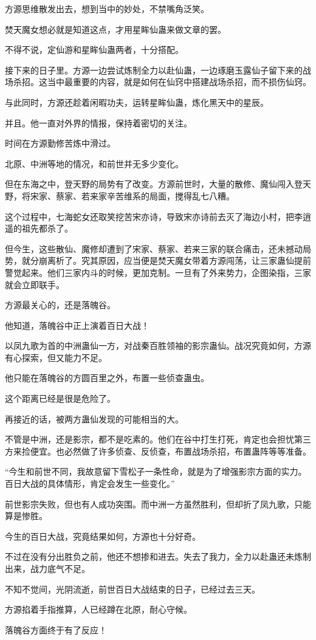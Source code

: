 \begin{this_body}
方源思维散发出去，想到当中的妙处，不禁嘴角泛笑。

焚天魔女想必就是知道这点，才用星眸仙蛊来做文章的罢。

不得不说，定仙游和星眸仙蛊两者，十分搭配。

接下来的日子里。方源一边尝试炼制全力以赴仙蛊，一边琢磨玉露仙子留下来的战场杀招。这当中最重要的内容，就是如何在仙窍中搭建战场杀招，而不损伤仙窍。

与此同时，方源还趁着闲暇功夫，运转星眸仙蛊，炼化黑天中的星辰。

并且。他一直对外界的情报，保持着密切的关注。

时间在方源勤修苦炼中滑过。

北原、中洲等地的情况，和前世并无多少变化。

但在东海之中，登天野的局势有了改变。方源前世时，大量的散修、魔仙闯入登天野，将宋家、蔡家、若来家辛苦维系的局面，搅得乱七八糟。

这个过程中，七海蛇女还取笑挖苦宋亦诗，导致宋亦诗前去灭了海边小村，把李逍遥的祖先都杀了。

但今生，这些散仙、魔修却遭到了宋家、蔡家、若来三家的联合痛击，还未撼动局势，就分崩离析了。究其原因，应当便是焚天魔女带着方源闯荡，让三家蛊仙提前警觉起来。他们三家内斗的时候，更加克制。一旦有了外来势力，企图染指，三家就会立即联手。

方源最关心的，还是落魄谷。

他知道，落魄谷中正上演着百日大战！

以凤九歌为首的中洲蛊仙一方，对战秦百胜领袖的影宗蛊仙。战况究竟如何，方源有心探索，但又能力不足。

他只能在落魄谷的方圆百里之外，布置一些侦查蛊虫。

这个距离已经是很是危险了。

再接近的话，被两方蛊仙发现的可能相当的大。

不管是中洲，还是影宗，都不是吃素的。他们在谷中打生打死，肯定也会担忧第三方来捡便宜。也必然做了许多侦查、反侦查，布置战场杀招，布置蛊阵等等准备。

“今生和前世不同，我故意留下雪松子一条性命，就是为了增强影宗方面的实力。百日大战的具体情形，肯定会发生一些变化。”

前世影宗失败，但也有人成功突围。而中洲一方虽然胜利，但却折了凤九歌，只能算是惨胜。

今生的百日大战，究竟结果如何，方源也十分好奇。

不过在没有分出胜负之前，他还不想掺和进去。失去了我力，全力以赴蛊还未炼制出来，战力底气不足。

不知不觉间，光阴流逝，前世百日大战结束的日子，已经过去三天。

方源掐着手指推算，人已经蹲在北原，耐心守候。

落魄谷方面终于有了反应！

\end{this_body}

